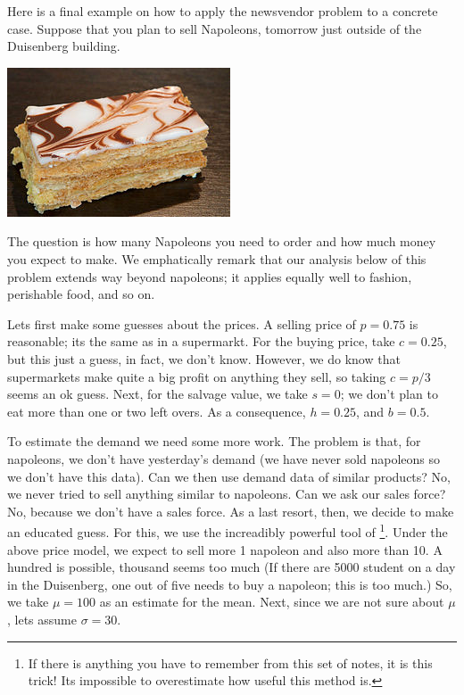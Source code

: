\begin{example}
Here is a final example on how to apply the newsvendor problem to a concrete case.  Suppose that you plan to sell Napoleons, tomorrow  just outside of the Duisenberg building.
  \begin{center}
   \includegraphics[scale = 1.0]{figures/mille-feuille}
  \end{center}
The question is how  many  Napoleons  you need to order and how much money  you expect to make. We emphatically remark that our analysis below  of this problem extends way beyond napoleons; it applies equally well to fashion, perishable food, and so on.
  

Lets first make some guesses about the prices. A selling price of $p=0.75$ is reasonable; its the same as in a supermarkt. For the buying price, take $c = 0.25$, but this just a guess, in fact, we don't know. However, we do know that supermarkets make quite a big profit on anything they sell, so taking $c=p/3$ seems an ok guess. Next, for the salvage value, we take $s=0$; we don't plan to eat more than one or two left overs. As a consequence, $h = 0.25$, and $b = 0.5$. 

To estimate  the demand we need some more work. The problem is that, for napoleons, we don't have yesterday's demand (we have never sold napoleons so we don't have this data). Can we then use demand data of similar products?  No, we  never tried to sell anything similar to napoleons. Can we ask our sales force?  No, because  we don't have a sales force.  As a last resort, then, we decide to make an educated guess. For this, we use the increadibly powerful tool of \footnote{If there is anything you have to remember from this set of notes, it is this trick! Its impossible to overestimate how useful this method is.}. Under the above price model, we expect to sell more 1 napoleon and also more than 10. A hundred  is possible, thousand seems too much (If there are 5000 student on a day in the Duisenberg, one out of five needs to buy a napoleon; this is too much.) So, we take  $\mu=100$ as an estimate for the mean. Next, since we are not sure about $\mu$, lets assume $\sigma=30$. 


\end{example}
